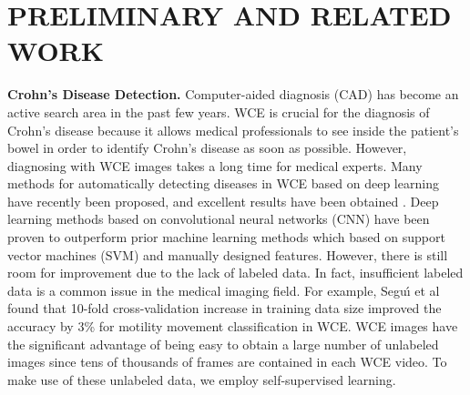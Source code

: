 \documentclass[conference]{IEEEtran}
\begin{document}
\section{PRELIMINARY AND RELATED WORK}
\label{sec:related work}
\textbf{Crohn's Disease Detection.}
 Computer-aided diagnosis (CAD) has become an active search area in the past few years. WCE is crucial for the diagnosis of Crohn's disease because it allows medical professionals to see inside the patient's bowel in order to identify Crohn's disease as soon as possible. However, diagnosing with WCE images takes a long time for medical experts.
Many methods for automatically detecting diseases in WCE based on deep learning have recently been proposed, and excellent results have been obtained \cite{review_WCE_CNN}.
Deep learning methods based on convolutional neural networks (CNN) have been proven to outperform prior machine learning methods which based on support vector machines (SVM) and manually designed features.
 However, there is still room for improvement due to the lack of labeled data. In fact, insufficient labeled data is a common issue in the medical imaging field. 
 For example, Segu{\'\i} et al\cite{segui2016generic} found that 10-fold cross-validation increase in training data size improved the accuracy by 3\% for motility movement classification in WCE.
WCE images have the significant advantage of being easy to obtain a large number of unlabeled images since tens of thousands of frames are contained in each WCE video. To make use of these unlabeled data, we employ self-supervised learning.
\end{document}
